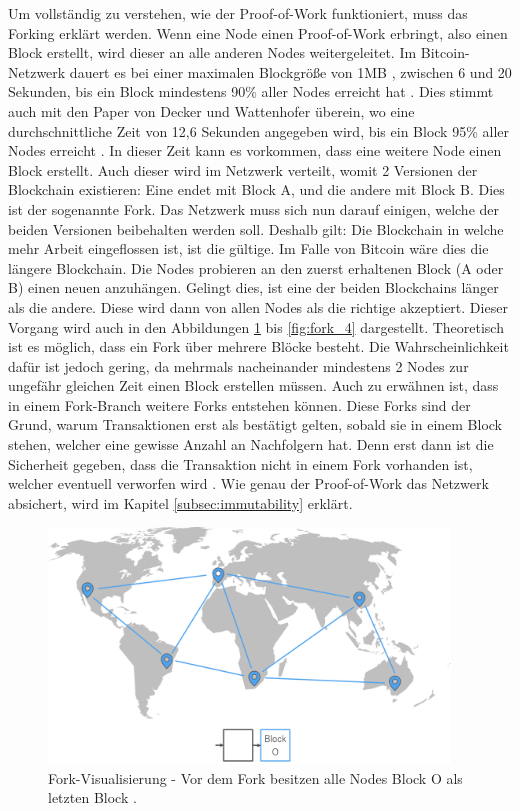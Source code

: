 Um vollständig zu verstehen, wie der Proof-of-Work funktioniert, muss das Forking erklärt werden. Wenn eine Node einen Proof-of-Work erbringt, also einen Block erstellt, wird dieser an alle anderen Nodes weitergeleitet. Im Bitcoin-Netzwerk dauert es bei einer maximalen Blockgröße von 1MB \cite{AntonopoulosMasteringbitcoin2015}, zwischen 6 und 20 Sekunden, bis ein Block mindestens 90\% aller Nodes erreicht hat \cite{BitcoinStats}. Dies stimmt auch mit den Paper von Decker und Wattenhofer überein, wo eine durchschnittliche Zeit von 12,6 Sekunden angegeben wird, bis ein Block 95\% aller Nodes erreicht \cite{DeckerInformationpropagationbitcoin2013}. In dieser Zeit kann es vorkommen, dass eine weitere Node einen Block erstellt. Auch dieser wird im Netzwerk verteilt, womit 2 Versionen der Blockchain existieren: Eine endet mit Block A, und die andere mit Block B. Dies ist der sogenannte Fork. Das Netzwerk muss sich nun darauf einigen, welche der beiden Versionen beibehalten werden soll. Deshalb gilt: Die Blockchain in welche mehr Arbeit eingeflossen ist, ist die gültige. Im Falle von Bitcoin wäre dies die längere Blockchain. Die Nodes probieren an den zuerst erhaltenen Block (A oder B) einen neuen anzuhängen. Gelingt dies, ist eine der beiden Blockchains länger als die andere. Diese wird dann von allen Nodes als die richtige akzeptiert. Dieser Vorgang wird auch in den Abbildungen \ref{fig:fork_1} bis \ref{fig:fork_4} dargestellt. Theoretisch ist es möglich, dass ein Fork über mehrere Blöcke besteht. Die Wahrscheinlichkeit dafür ist jedoch gering, da mehrmals nacheinander mindestens 2 Nodes zur ungefähr gleichen Zeit einen Block erstellen müssen. Auch zu erwähnen ist, dass in einem Fork-Branch weitere Forks entstehen können. Diese Forks sind der Grund, warum Transaktionen erst als bestätigt gelten, sobald sie in einem Block stehen, welcher eine gewisse Anzahl an Nachfolgern hat. Denn erst dann ist die Sicherheit gegeben, dass die Transaktion nicht in einem Fork vorhanden ist, welcher eventuell verworfen wird \cite{AntonopoulosMasteringbitcoin2015}. Wie genau der Proof-of-Work das Netzwerk absichert, wird im Kapitel \ref{subsec:immutability} erklärt.


\begin{figure}[htb]
  \centering
    \includegraphics[width=0.95\textwidth,angle=0]{images/fork_1}
 	\caption{Fork-Visualisierung - Vor dem Fork besitzen alle Nodes Block O als letzten Block \cite{AntonopoulosMasteringbitcoin2015}.}
	\label{fig:fork_1}
\end{figure}

